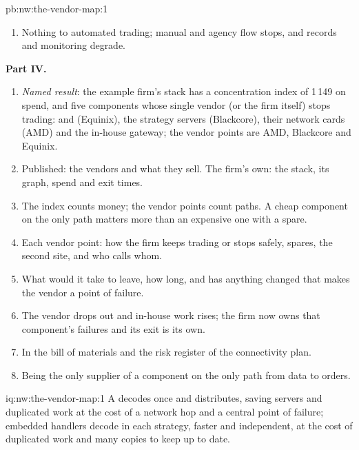 \begin{solution}{pb:nw:the-vendor-map:1}
\begin{enumerate}[resume]
  longer path, and half a year to move.
\item Nothing to automated trading; manual and agency flow stops, and records and monitoring degrade.
\end{enumerate}
\textbf{Part IV.}
\begin{enumerate}[resume]
\item \emph{Named result}: the example firm's stack has a concentration index of 1\,149 on spend, and five components whose single vendor
  (or the firm itself) stops trading:  and  (Equinix), the strategy servers (Blackcore), their network cards (AMD)
  and the in-house gateway; the vendor points are AMD, Blackcore and Equinix.
\item Published: the vendors and what they sell. The firm's own: the stack, its graph, spend and exit times.
\item The index counts money; the vendor points count paths. A cheap component on the only path matters more than an expensive one
  with a spare.
\item Each vendor point: how the firm keeps trading or stops safely, spares, the second site, and who calls whom.
\item What would it take to leave, how long, and has anything changed that makes the vendor a point of failure.
\item The  vendor drops out and in-house work rises; the firm now owns that component's failures and its exit is its own.
\item In the bill of materials and the risk register of the connectivity plan.
\item Being the only supplier of a component on the only path from data to orders.
\end{enumerate}
\end{solution}

\begin{solution}{iq:nw:the-vendor-map:1}
A  decodes once and distributes, saving servers and duplicated work at the cost of a network hop and a central point of
failure; embedded handlers decode in each strategy, faster and independent, at the cost of duplicated work and many copies to keep up
to date.
\end{solution}

